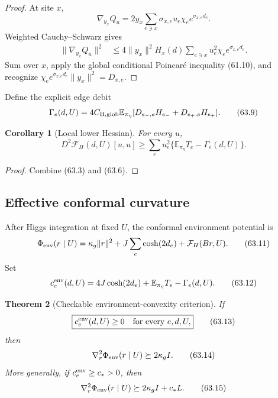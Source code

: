 \documentclass[11pt]{article}
\newtheorem{theorem}{Theorem}[section]
\newtheorem{corollary}[theorem]{Corollary}
\theoremstyle{remark}
\begin{document}
\begin{proof}
At site \(x\),
\[
 \nabla_{y_x}Q_u
 =
 2y_x\sum_{e\ni x}
 \sigma_{x,e}u_e\chi_e e^{\sigma_{x,e}d_e}.       \tag{63.7}
\]
Weighted Cauchy--Schwarz gives
\[
\begin{aligned}
 \|\nabla_{y_x}Q_u\|^2
 &\leq
 4\|y_x\|^2H_x(d)
 \sum_{e\ni x}u_e^2\chi_e e^{\sigma_{x,e}d_e}.
                                                               \tag{63.8}
\end{aligned}
\]
Sum over \(x\), apply the global conditional Poincar\'e inequality
(61.10), and recognize
\(\chi_e e^{\sigma_{x,e}d_e}\|y_x\|^2=D_{x,e}\).
\end{proof}

Define the explicit edge debit
\[
 \Gamma_e(d,U)
 =
 4C_{\rm H,glob}
 \mathbb E_{\pi_\eta}
 [D_{e_-,e}H_{e_-}+D_{e_+,e}H_{e_+}].            \tag{63.9}
\]

\begin{corollary}[Local lower Hessian]
\label{cor:v17v63-lower}
For every \(u\),
\[
\boxed{
 D^2\mathcal F_H(d,U)[u,u]
 \geq
 \sum_eu_e^2
 \{\mathbb E_{\pi_\eta}T_e-\Gamma_e(d,U)\}.}       \tag{63.10}
\]
\end{corollary}

\begin{proof}
Combine (63.3) and (63.6).
\end{proof}

\subsection{Effective conformal curvature}

After Higgs integration at fixed \(U\), the conformal environment
potential is
\[
 \Phi_{\rm env}(r\mid U)
 =
 \kappa_g\|r\|^2+
 J\sum_e\cosh(2d_e)+\mathcal F_H(Br,U).           \tag{63.11}
\]
Set
\[
 c_e^{\rm env}(d,U)
 =
 4J\cosh(2d_e)
 +\mathbb E_{\pi_\eta}T_e-\Gamma_e(d,U).          \tag{63.12}
\]

\begin{theorem}[Checkable environment-convexity criterion]
\label{thm:v17v63-environment}
If
\[
\boxed{
 c_e^{\rm env}(d,U)\geq0
 \quad\text{for every }e,d,U,}                    \tag{63.13}
\]
then
\[
 \nabla_r^2\Phi_{\rm env}(r\mid U)
 \succeq2\kappa_gI.                               \tag{63.14}
\]
More generally, if \(c_e^{\rm env}\geq c_*>0\), then
\[
 \nabla_r^2\Phi_{\rm env}(r\mid U)
 \succeq2\kappa_gI+c_*L.                          \tag{63.15}
\]
\end{theorem}
\end{document}
